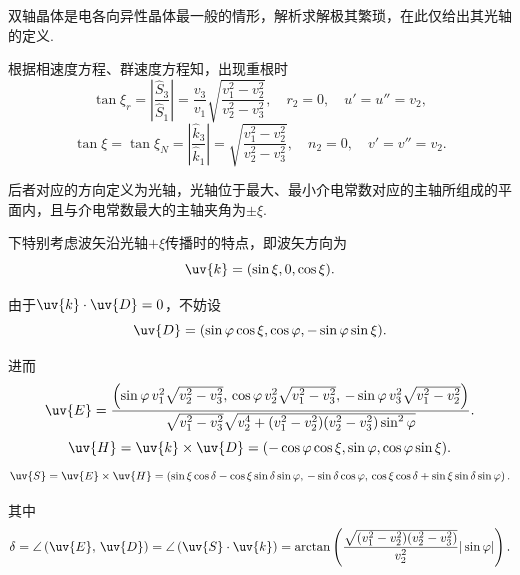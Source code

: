 双轴晶体是电各向异性晶体最一般的情形，解析求解极其繁琐，在此仅给出其光轴的定义.

根据相速度方程、群速度方程知，出现重根时
\begin{equation*}
	\tan\xi_r =|\frac{\hat{S}_3}{\hat{S}_1}|=\frac{v_3}{v_1} \sqrt{\frac{v_1^2 - v_2^2}{v_2^2 - v_3^2}},\quad r_2=0,\quad  u'=u''=v_2,
\end{equation*}
\begin{equation*}
	\tan\xi = \tan\xi_N =|\frac{\hat{k}_3}{\hat{k}_1}|= \sqrt{\frac{v_1^2 - v_2^2}{v_2^2 - v_3^2}},\quad n_2=0,\quad  v'=v''=v_2.
\end{equation*}

后者对应的方向定义为光轴，光轴位于最大、最小介电常数对应的主轴所组成的平面内，且与介电常数最大的主轴夹角为\(\pm \xi\).

下特别考虑波矢沿光轴\(+\xi\)传播时的特点，即波矢方向为
\begin{equation*}
	\uv{k} = (\sin\xi, 0, \cos\xi).
\end{equation*}

由于\(\uv{k}\cdot\uv{D}=0\)，不妨设
\begin{equation*}
	\uv{D} = (\sin\varphi \cos\xi, \cos\varphi, -\sin\varphi \sin\xi).
\end{equation*}

进而
\begin{equation*}
	\uv{E} = \frac{\left( \sin\varphi \, v_1^2 \sqrt{v_2^2 - v_3^2}, \, \cos\varphi \, v_2^2 \sqrt{v_1^2 - v_3^2}, \, -\sin\varphi \, v_3^2 \sqrt{v_1^2 - v_2^2} \right)}{\sqrt{v_1^2 - v_3^2} \sqrt{v_2^4 + (v_1^2 - v_2^2)(v_2^2 - v_3^2) \sin^2\varphi}}.
\end{equation*}
\begin{equation*}
	\uv{H} =\uv{k}\times\uv{D}= (-\cos\varphi \cos\xi, \sin\varphi, \cos\varphi \sin\xi).
\end{equation*}
\begin{equation*}
	\uv{S} = \uv{E} \times \uv{H} = \left( \sin\xi \cos\delta - \cos\xi \sin\delta \sin\varphi, \, -\sin\delta \cos\varphi, \, \cos\xi \cos\delta + \sin\xi \sin\delta \sin\varphi \right).
\end{equation*}

其中
\begin{equation*}
	\delta = \angle\left( \uv{E}, \, \uv{D} \right) = \angle\left( \uv{S} \cdot \uv{k} \right) = \arctan\left( \frac{\sqrt{(v_1^2 - v_2^2)(v_2^2 - v_3^2)}}{v_2^2 } |\sin\varphi|\right).
\end{equation*}

